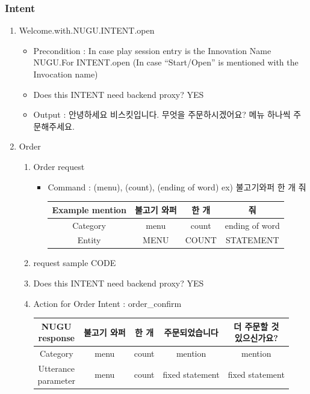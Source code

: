 \documentclass[conference,compsoc]{IEEEtran}
\begin{document}
\subsubsection{Intent}
\begin{enumerate}
  \item Welcome.with.NUGU.INTENT.open
  \begin{itemize}
    \item Precondition : In case play session entry is the Innovation Name NUGU.For INTENT.open (In case “Start/Open” is mentioned with the Invocation name)
    \item Does this INTENT need backend proxy? YES
    \item Output : 안녕하세요 비스킷입니다. 무엇을 주문하시겠어요? 메뉴 하나씩 주문해주세요.
  \end{itemize}
  
  \item Order
  \begin{enumerate}
    \item Order request
    \begin{itemize}
      \item Command : (menu), (count), (ending of word) ex) 불고기와퍼 한 개 줘
      \begin{table}[h!] \renewcommand\arraystretch{1.75}
      \centering
      \begin{tabular}{@{}c | c c c@{}}
      \hline
      Example mention & 불고기 와퍼 & 한 개  & 줘               \\ 
      \hline
      Category        & menu   & count & ending of word  \\ 
      \hline
      Entity          & MENU   & COUNT & STATEMENT       \\
      \hline
      \end{tabular}
      \end{table}      
    \end{itemize}
    
    \item request sample
    CODE
    
    \item Does this INTENT need backend proxy? YES
    
    \item Action for Order Intent : order\_confirm
    \begin{table}[h!] \renewcommand\arraystretch{1.25}
      \centering
        \begin{tabular}{@{}c | c c c c@{}}
        \hline
        \makecell{NUGU \\ response} & 불고기 와퍼 & 한 개 & 주문되었습니다 & \makecell{더 주문할 것 \\ 있으신가요?}  \\ 
        \hline
        Category        & menu   & count & mention & mention \\ 
        \hline
        \makecell{Utterance \\ parameter}  & menu & count & fixed statement & fixed statement \\
        \hline
        \end{tabular}
    \end{table}  
  

\end{enumerate}
\end{enumerate}
\end{document}
